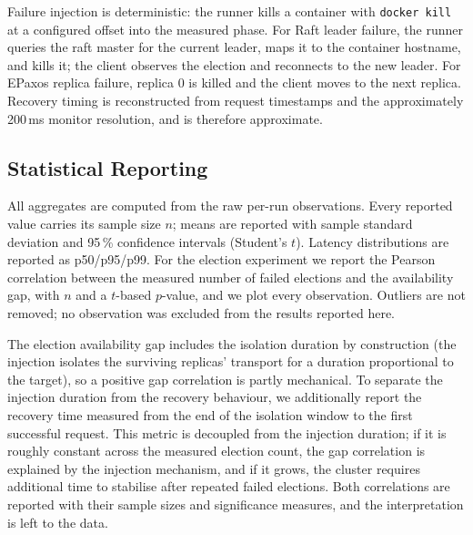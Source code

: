 Failure injection is deterministic: the runner kills a container with
\texttt{docker kill} at a configured offset into the measured phase. For
Raft leader failure, the runner queries the raft master for the current
leader, maps it to the container hostname, and kills it; the client observes
the election and reconnects to the new leader. For EPaxos replica failure,
replica 0 is killed and the client moves to the next replica. Recovery
timing is reconstructed from request timestamps and the approximately
200\,ms monitor resolution, and is therefore approximate.

\subsection{Statistical Reporting}

All aggregates are computed from the raw per-run observations. Every
reported value carries its sample size $n$; means are reported with sample
standard deviation and 95\,\% confidence intervals (Student's $t$). Latency
distributions are reported as p50/p95/p99. For the election experiment we
report the Pearson correlation between the measured number of failed
elections and the availability gap, with $n$ and a $t$-based $p$-value, and
we plot every observation. Outliers are not removed; no observation was
excluded from the results reported here.

The election availability gap includes the isolation duration by
construction (the injection isolates the surviving replicas' transport for
a duration proportional to the target), so a positive gap correlation is
partly mechanical. To separate the injection duration from the recovery
behaviour, we additionally report the recovery time measured from the end
of the isolation window to the first successful request. This metric is
decoupled from the injection duration; if it is roughly constant across the
measured election count, the gap correlation is explained by the injection
mechanism, and if it grows, the cluster requires additional time to
stabilise after repeated failed elections. Both correlations are reported
with their sample sizes and significance measures, and the interpretation
is left to the data.